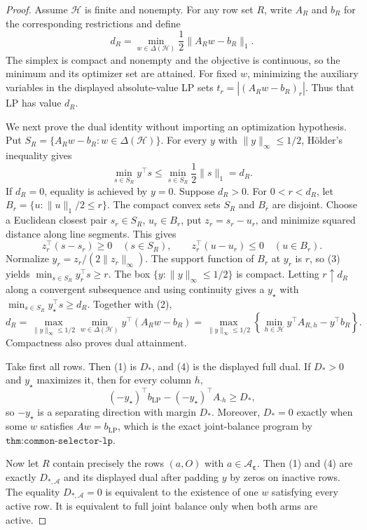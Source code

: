 \documentclass{article}
\begin{document}
\begin{proof}
Assume \(\mathcal H\) is finite and nonempty. For any row set \(R\), write \(A_R\) and \(b_R\) for the corresponding restrictions and define
\[
d_R=\min_{w\in\Delta(\mathcal H)}\frac12\lVert A_Rw-b_R\rVert_1.
\tag{1}
\]
The simplex is compact and nonempty and the objective is continuous, so the minimum and its optimizer set are attained. For fixed \(w\), minimizing the auxiliary variables in the displayed absolute-value LP sets \(t_r=|(A_Rw-b_R)_r|\). Thus that LP has value \(d_R\).

We next prove the dual identity without importing an optimization hypothesis. Put \(S_R=\{A_Rw-b_R:w\in\Delta(\mathcal H)\}\). For every \(y\) with \(\lVert y\rVert_\infty\le1/2\), Hölder's inequality gives
\[
\min_{s\in S_R}y^\top s\le\min_{s\in S_R}\frac12\lVert s\rVert_1=d_R.
\tag{2}
\]
If \(d_R=0\), equality is achieved by \(y=0\). Suppose \(d_R>0\). For \(0<r<d_R\), let \(B_r=\{u:\lVert u\rVert_1/2\le r\}\). The compact convex sets \(S_R\) and \(B_r\) are disjoint. Choose a Euclidean closest pair \(s_r\in S_R\), \(u_r\in B_r\), put \(z_r=s_r-u_r\), and minimize squared distance along line segments. This gives
\[
z_r^\top(s-s_r)\ge0\quad(s\in S_R),\qquad z_r^\top(u-u_r)\le0\quad(u\in B_r).
\tag{3}
\]
Normalize \(y_r=z_r/(2\lVert z_r\rVert_\infty)\). The support function of \(B_r\) at \(y_r\) is \(r\), so (3) yields \(\min_{s\in S_R}y_r^\top s\ge r\). The box \(\{y:\lVert y\rVert_\infty\le1/2\}\) is compact. Letting \(r\uparrow d_R\) along a convergent subsequence and using continuity gives a \(y_\star\) with \(\min_{s\in S_R}y_\star^\top s\ge d_R\). Together with (2),
\[
d_R=\max_{\lVert y\rVert_\infty\le1/2}\min_{w\in\Delta(\mathcal H)}y^\top(A_Rw-b_R)=\max_{\lVert y\rVert_\infty\le1/2}\left\{\min_{h\in\mathcal H}y^\top A_{R,h}-y^\top b_R\right\}.
\tag{4}
\]
Compactness also proves dual attainment.

Take first all rows. Then (1) is \(D_*\), and (4) is the displayed full dual. If \(D_*>0\) and \(y_\star\) maximizes it, then for every column \(h\),
\[
(-y_\star)^\top b_{\mathrm{LP}}-(-y_\star)^\top A_{\cdot h}\ge D_*,
\]
so \(-y_\star\) is a separating direction with margin \(D_*\). Moreover, \(D_*=0\) exactly when some \(w\) satisfies \(Aw=b_{\mathrm{LP}}\), which is the exact joint-balance program by \(\texttt{thm:common-selector-lp}\).

Now let \(R\) contain precisely the rows \((a,O)\) with \(a\in\mathcal A_{\boldsymbol\varepsilon}\). Then (1) and (4) are exactly \(D_{*,\mathcal A}\) and its displayed dual after padding \(y\) by zeros on inactive rows. The equality \(D_{*,\mathcal A}=0\) is equivalent to the existence of one \(w\) satisfying every active row. It is equivalent to full joint balance only when both arms are active.


\end{proof}
\end{document}
